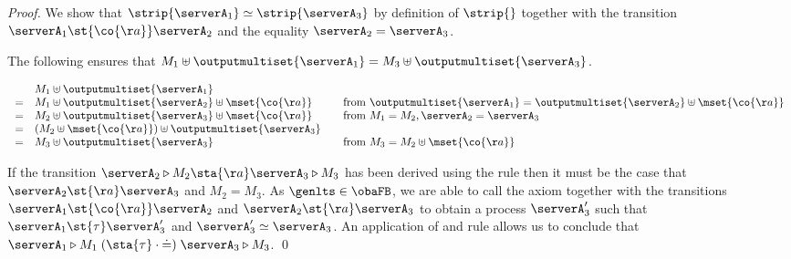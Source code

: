 \begin{proof}
  We show that $\strip{ \serverA_1 } \simeq \strip{ \serverA_3 }$ by definition of
  $\strip{}$ together with the transition
  $\serverA_1 \st{\co{\aa}} \serverA_2$ and the equality $\serverA_2 = \serverA_3$.

  The following ensures that
  $M_1 \uplus \outputmultiset{\serverA_1} = M_3 \uplus \outputmultiset{\serverA_3}$.

  $$
  \begin{array}{llll}
  & M_1 \uplus \outputmultiset{\serverA_1}\\
  = & M_1 \uplus \outputmultiset{\serverA_2} \uplus \mset{\co{\aa}} && \text{from } \outputmultiset{\serverA_1} = \outputmultiset{\serverA_2} \uplus \mset{\co{\aa}}\\
  = & M_2 \uplus \outputmultiset{\serverA_3} \uplus \mset{\co{\aa}} && \text{from } M_1 = M_2, \serverA_2 = \serverA_3\\
  = & (M_2 \uplus \mset{\co{\aa}}) \uplus \outputmultiset{\serverA_3}\\
  = & M_3 \uplus \outputmultiset{\serverA_3} && \text{from } M_3 = M_2 \uplus \mset{\co{\aa}}\\
  \end{array}
  $$

  If the transition $\serverA_2 \triangleright M_2  \sta{\aa} \serverA_3 \triangleright M_3$
  has been derived using the rule \stproclift then it must be the case that
  $\serverA_2 \st{\aa} \serverA_3$ and $M_2 = M_3$.
  As $\genlts \in \obaFB$, we are able to call the axiom
  \outputfeedback together with the transitions
  $\serverA_1 \st{\co{\aa}} \serverA_2$ and $\serverA_2 \st{\aa} \serverA_3$
  to obtain a process $\serverA'_3$
  such that $\serverA_1 \st{\tau} \serverA'_3$ and $\serverA'_3 \simeq \serverA_3$.
  An application of  and rule \stproclift allows us to conclude that
  $\serverA_1 \triangleright M_1 \mathrel{({\sta{\tau}} \cdot {\doteq})} \serverA_3 \triangleright M_3$. \qed
\end{proof}
